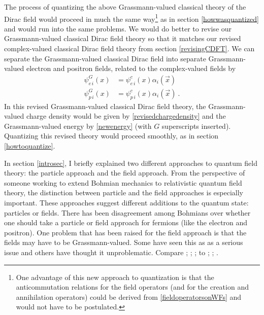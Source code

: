 \documentclass[12pt,secnumarabic,amsmath,amssymb,balancelastpage,nofootinbib]{article}
\begin{document}
The process of quantizing the above Grassmann-valued classical theory of the Dirac field would proceed in much the same way\footnote{One advantage of this new approach to quantization is that the anticommutation relations for the field operators (and for the creation and annihilation operators) could be derived from \eqref{fieldoperatorsonWFs} and would not have to be postulated.} as in section \ref{howwasquantized} and would run into the same problems.  We would do better to revise our Grassmann-valued classical Dirac field theory so that it matches our revised complex-valued classical Dirac field theory from section \ref{revisingCDFT}.  We can separate the Grassmann-valued classical Dirac field into separate Grassmann-valued electron and positron fields, related to the complex-valued fields by
\begin{align}
\psi^G_{e\,i}(x)&=\psi^c_{e\,i}(x) \alpha_i(\vec{x})
\nonumber
\\
\psi^G_{p\,i}(x)&=\psi^c_{p\,i}(x) \alpha_i(\vec{x})
\ .
\end{align}
In this revised Grassmann-valued classical Dirac field theory, the Grassmann-valued charge density would be given by \eqref{revisedchargedensity} and the Grassmann-valued energy by \eqref{newenergy} (with $G$ superscripts inserted).  Quantizing this revised theory would proceed smoothly, as in section \ref{howtoquantize}.

In section \ref{introsec}, I briefly explained two different approaches to quantum field theory: the particle approach and the field approach.  From the perspective of someone working to extend Bohmian mechanics to relativistic quantum field theory, the distinction between particle and the field approaches is especially important.  These approaches suggest different additions to the quantum state: particles or fields.  There has been disagreement among Bohmians over whether one should take a particle or field approach for fermions (like the electron and positron).  One problem that has been raised for the field approach is that the fields may have to be Grassmann-valued.  Some have seen this as as a serious issue and others have thought it unproblematic.  Compare \citet[pg.\ 374]{bohm1987}; \citet[pg.\ 156]{kaloyerou1996}; \citet[sec.\ 9.2]{struyve2010}; \citet[sec.\ 3.3]{struyve2011} to \citet[sec.\ 4.2]{valentini1992}; \citet{valentini1996}; \citet[pg.\ 519]{holland}.
\end{document}
